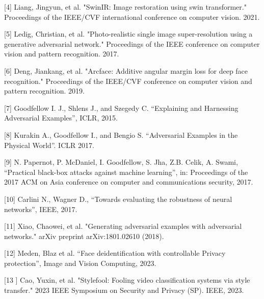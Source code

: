 [4] Liang, Jingyun, et al. "SwinIR: Image restoration using swin transformer." Proceedings of the IEEE/CVF international conference on computer vision. 2021.

[5] Ledig, Christian, et al. "Photo-realistic single image super-resolution using a generative adversarial network." Proceedings of the IEEE conference on computer vision and pattern recognition. 2017.

[6] Deng, Jiankang, et al. "Arcface: Additive angular margin loss for deep face recognition." Proceedings of the IEEE/CVF conference on computer vision and pattern recognition. 2019.

[7] Goodfellow I. J., Shlens J., and Szegedy C. “Explaining and Harnessing Adversarial Examples”, ICLR, 2015.

[8] Kurakin A., Goodfellow I., and Bengio S. “Adversarial Examples in the Physical World”. ICLR 2017.

[9] N. Papernot, P. McDaniel, I. Goodfellow, S. Jha, Z.B. Celik, A. Swami, “Practical black-box attacks against machine learning”, in: Proceedings of the 2017 ACM on Asia conference on computer and communications security, 2017.

[10] Carlini N., Wagner D., “Towards evaluating the robustness of neural networks”, IEEE, 2017.

[11] Xiao, Chaowei, et al. "Generating adversarial examples with adversarial networks." arXiv preprint arXiv:1801.02610 (2018).

[12] Meden, Blaz et al. “Face deidentification with controllable Privacy protection”, Image and Vision Computing, 2023.

[13 ] Cao, Yuxin, et al. "Stylefool: Fooling video classification systems via style transfer." 2023 IEEE Symposium on Security and Privacy (SP). IEEE, 2023.
